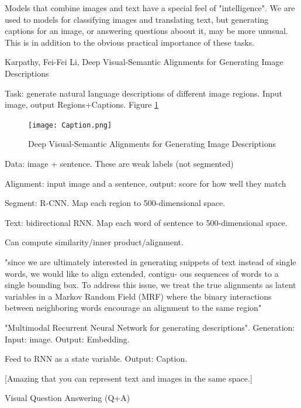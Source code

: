 \documentclass[english]{article}
\begin{document}
\benum
\item Models that combine images and text have a special feel of "intelligence". We are used to models for classifying images and translating text, but generating captions for an image, or answering questions aboout it, may be more unusual. This is in addition to the obvious practical importance of these tasks. 

\item 
Karpathy, Fei-Fei Li, Deep Visual-Semantic Alignments for Generating Image Descriptions
\benum 
\item Task: generate natural language descriptions of different image regions. Input image, output Regions+Captions. Figure \ref{Caption}

\begin{figure}
  \centering
  \texttt{[image: Caption.png]}
    \caption{Deep Visual-Semantic Alignments for Generating Image Descriptions}
    \label{Caption}
\end{figure}

\item Data:  image + sentence. These are weak labels (not segmented)

\item Alignment: input image and a sentence, output: score for how well they match

Segment: R-CNN. Map each region to 500-dimensional space.

Text: bidirectional RNN. Map each word of sentence to 500-dimensional space. 

Can compute similarity/inner product/alignment.

"since we are
ultimately interested in generating snippets of text instead
of single words, we would like to align extended, contigu-
ous sequences of words to a single bounding box.
To address this issue, we treat the true alignments as latent
variables in a Markov Random Field (MRF) where the binary interactions between neighboring words encourage an alignment to the same region"

\item "Multimodal Recurrent Neural Network for
generating descriptions". Generation: Input: image. Output: Embedding. 

Feed to RNN as a state variable. Output: Caption.

[Amazing that you can represent text and images in the same space.]
\eenum 

\item Visual Question Answering (Q+A)
\end{document}

